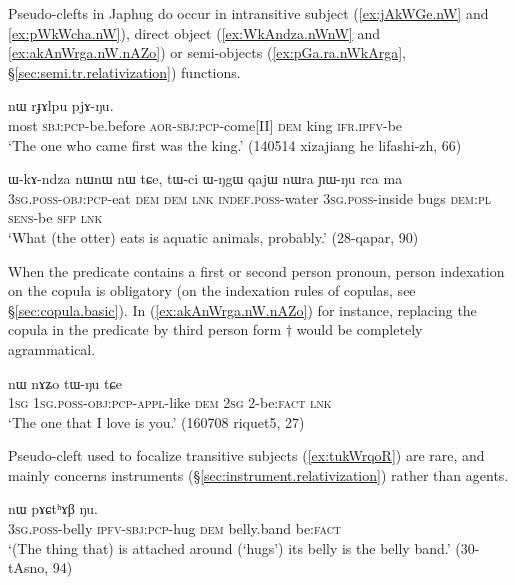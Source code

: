 Pseudo-clefts in Japhug do occur in intransitive subject (\ref{ex:jAkWGe.nW} and  \ref{ex:pWkWcha.nW}), direct object (\ref{ex:WkAndza.nWnW} and \ref{ex:akAnWrga.nW.nAZo}) or semi-objects (\ref{ex:pGa.ra.nWkArga}, §\ref{sec:semi.tr.relativization}) functions.

\begin{exe}
\ex \label{ex:jAkWGe.nW}
 nɯ rɟɤlpu pjɤ-ŋu.\\
most \textsc{sbj}:\textsc{pcp}-be.before \textsc{aor}-\textsc{sbj}:\textsc{pcp}-come[II] \textsc{dem} king \textsc{ifr}.\textsc{ipfv}-be\\
\glt `The one who came first was the king.' (140514 xizajiang he lifashi-zh, 66)
\end{exe}

\begin{exe}
\ex \label{ex:WkAndza.nWnW}
\gll ɯ-kɤ-ndza nɯnɯ nɯ tɕe, tɯ-ci ɯ-ŋgɯ qajɯ nɯra ɲɯ-ŋu rca ma \\
\textsc{3sg}.\textsc{poss}-\textsc{obj}:\textsc{pcp}-eat \textsc{dem} \textsc{dem} \textsc{lnk} \textsc{indef}.\textsc{poss}-water \textsc{3sg}.\textsc{poss}-inside bugs \textsc{dem}:\textsc{pl} \textsc{sens}-be \textsc{sfp} \textsc{lnk} \\
\glt `What (the otter) eats is aquatic animals, probably.' (28-qapar, 90)
\end{exe}

When the predicate contains a first or second person pronoun, person indexation on the copula is obligatory (on the indexation rules of copulas, see §\ref{sec:copula.basic}). In  (\ref{ex:akAnWrga.nW.nAZo}) for instance, replacing the copula in the predicate  by third person form $\dagger$ would be completely agrammatical.
 
\begin{exe}
\ex \label{ex:akAnWrga.nW.nAZo}
 nɯ nɤʑo tɯ-ŋu tɕe \\
\textsc{1sg} \textsc{1sg}.\textsc{poss}-\textsc{obj}:\textsc{pcp}-\textsc{appl}-like \textsc{dem} \textsc{2sg} 2-be:\textsc{fact} \textsc{lnk} \\
\glt `The one that I love is you.' (160708 riquet5, 27)
\end{exe}

Pseudo-cleft used to focalize transitive subjects (\ref{ex:tukWrqoR}) are rare, and mainly concerns instruments (§\ref{sec:instrument.relativization}) rather than agents.

\begin{exe}
\ex \label{ex:tukWrqoR}
 nɯ pɤɕtʰɤβ ŋu. \\
\textsc{3sg}.\textsc{poss}-belly \textsc{ipfv}-\textsc{sbj}:\textsc{pcp}-hug \textsc{dem} belly.band be:\textsc{fact} \\
\glt `(The thing that) is attached around (`hugs') its belly is the belly band.' (30-tAsno, 94)
 \end{exe}
 
